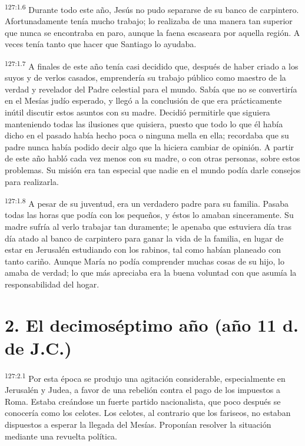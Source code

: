 \par
\textsuperscript{127:1.6} Durante todo este año, Jesús no pudo separarse de su banco de carpintero. Afortunadamente tenía mucho trabajo; lo realizaba de una manera tan superior que nunca se encontraba en paro, aunque la faena escaseara por aquella región. A veces tenía tanto que hacer que Santiago lo ayudaba.

\par
\textsuperscript{127:1.7} A finales de este año tenía casi decidido que, después de haber criado a los suyos y de verlos casados, emprendería su trabajo público como maestro de la verdad y revelador del Padre celestial para el mundo. Sabía que no se convertiría en el Mesías judío esperado, y llegó a la conclusión de que era prácticamente inútil discutir estos asuntos con su madre. Decidió permitirle que siguiera manteniendo todas las ilusiones que quisiera, puesto que todo lo que él había dicho en el pasado había hecho poca o ninguna mella en ella; recordaba que su padre nunca había podido decir algo que la hiciera cambiar de opinión. A partir de este año habló cada vez menos con su madre, o con otras personas, sobre estos problemas. Su misión era tan especial que nadie en el mundo podía darle consejos para realizarla.

\par
\textsuperscript{127:1.8} A pesar de su juventud, era un verdadero padre para su familia. Pasaba todas las horas que podía con los pequeños, y éstos lo amaban sinceramente. Su madre sufría al verlo trabajar tan duramente; le apenaba que estuviera día tras día atado al banco de carpintero para ganar la vida de la familia, en lugar de estar en Jerusalén estudiando con los rabinos, tal como habían planeado con tanto cariño. Aunque María no podía comprender muchas cosas de su hijo, lo amaba de verdad; lo que más apreciaba era la buena voluntad con que asumía la responsabilidad del hogar.

\section*{2. El decimoséptimo año (año 11 d. de J.C.)}
\par
\textsuperscript{127:2.1} Por esta época se produjo una agitación considerable, especialmente en Jerusalén y Judea, a favor de una rebelión contra el pago de los impuestos a Roma. Estaba creándose un fuerte partido nacionalista, que poco después se conocería como los celotes. Los celotes, al contrario que los fariseos, no estaban dispuestos a esperar la llegada del Mesías. Proponían resolver la situación mediante una revuelta política.

